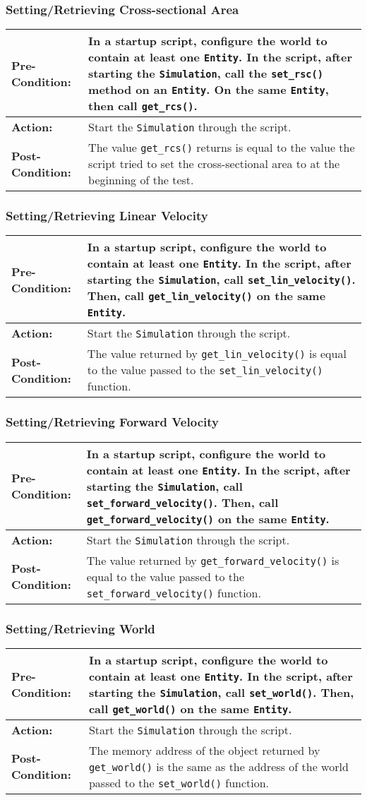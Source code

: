 \documentclass[titlepage]{article}
\newcommand{\testcase}[3]{
    \begin{center}
    \begin{tabular}{| l | p{0.7\textwidth}|}
        \hline
        \rowcolor[gray]{0.8}\textbf{Pre-Condition:} & #1 \\ \hline
        \textbf{Action:} & #2 \\ \hline
        \rowcolor[gray]{0.8}\textbf{Post-Condition:} & #3 \\ \hline
    \end{tabular}
    \end{center}
}
\begin{document}
\subsubsection{Setting/Retrieving Cross-sectional Area}
\testcase{In a startup script, configure the world to contain at least one \texttt{Entity}. In the script, after starting the \texttt{Simulation}, call the \texttt{set\_rsc()} method on an \texttt{Entity}.  On the same \texttt{Entity}, then call \texttt{get\_rcs()}.}{Start the \texttt{Simulation} through the script.}{The value \texttt{get\_rcs()} returns is equal to the value the script tried to set the cross-sectional area to at the beginning of the test.}

\subsubsection{Setting/Retrieving Linear Velocity}
\testcase{In a startup script, configure the world to contain at least one \texttt{Entity}. In the script, after starting the \texttt{Simulation}, call \texttt{set\_lin\_velocity()}. Then, call \texttt{get\_lin\_velocity()} on the same \texttt{Entity}.}{Start the \texttt{Simulation} through the script.}{The value returned by \texttt{get\_lin\_velocity()} is equal to the value passed to the \texttt{set\_lin\_velocity()} function.}

\subsubsection{Setting/Retrieving Forward Velocity}
\testcase{In a startup script, configure the world to contain at least one \texttt{Entity}. In the script, after starting the \texttt{Simulation}, call \texttt{set\_forward\_velocity()}. Then, call \texttt{get\_forward\_velocity()} on the same \texttt{Entity}.}{Start the \texttt{Simulation} through the script.}{The value returned by \texttt{get\_forward\_velocity()} is equal to the value passed to the \texttt{set\_forward\_velocity()} function.}

\subsubsection{Setting/Retrieving World}
\testcase{In a startup script, configure the world to contain at least one \texttt{Entity}. In the script, after starting the \texttt{Simulation}, call \texttt{set\_world()}. Then, call \texttt{get\_world()} on the same \texttt{Entity}.}{Start the \texttt{Simulation} through the script.}{The memory address of the object returned by \texttt{get\_world()} is the same as the address of the world passed to the \texttt{set\_world()} function.}
\end{document}
